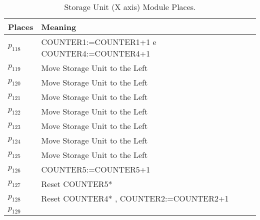 \begin{table}[H]
\caption{Storage Unit (X axis) Module Places.}
\centering
\begin{tabular}{M{5cm}M{10cm}}
Places & Meaning\\
\hline
\hyperlink{partialNet:p118}{\hypertarget{partialTable:p118}{$p_{118}$}} & COUNTER1:=COUNTER1+1 e COUNTER4:=COUNTER4+1\\
\hyperlink{partialNet:p119}{\hypertarget{partialTable:p119}{$p_{119}$}} & Move Storage Unit to the Left\\
\hyperlink{partialNet:p120}{\hypertarget{partialTable:p120}{$p_{120}$}} & Move Storage Unit to the Left\\
\hyperlink{partialNet:p121}{\hypertarget{partialTable:p121}{$p_{121}$}} & Move Storage Unit to the Left\\
\hyperlink{partialNet:p122}{\hypertarget{partialTable:p122}{$p_{122}$}} & Move Storage Unit to the Left\\
\hyperlink{partialNet:p123}{\hypertarget{partialTable:p123}{$p_{123}$}} & Move Storage Unit to the Left\\
\hyperlink{partialNet:p124}{\hypertarget{partialTable:p124}{$p_{124}$}} & Move Storage Unit to the Left\\
\hyperlink{partialNet:p125}{\hypertarget{partialTable:p125}{$p_{125}$}} & Move Storage Unit to the Left\\
\hyperlink{partialNet:p126}{\hypertarget{partialTable:p126}{$p_{126}$}} & COUNTER5:=COUNTER5+1\\
\hyperlink{partialNet:p127}{\hypertarget{partialTable:p127}{$p_{127}$}} & Reset COUNTER5*\\
\hyperlink{partialNet:p128}{\hypertarget{partialTable:p128}{$p_{128}$}} & Reset COUNTER4* , COUNTER2:=COUNTER2+1\\
\hyperlink{partialNet:p129}{\hypertarget{partialTable:p129}{$p_{129}$}} & \\
\end{tabular}
\end{table}
